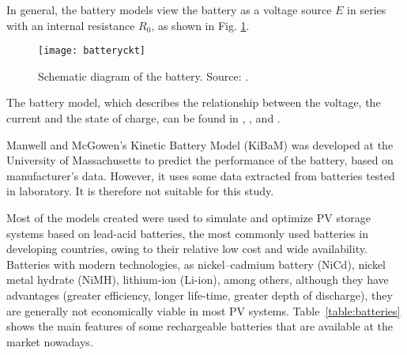 In general, the battery models view the battery as a voltage source $ E $ in series with an internal resistance $ R_{0} $, as shown in Fig. \ref{fig:batteryckt}. 

\begin{figure}[h]
\texttt{[image: batteryckt]}
\centering
\caption{Schematic diagram of the battery. Source: \cite{Hansen}.}
\label{fig:batteryckt}
\end{figure}


The battery model, which describes the relationship between the voltage, the current and the state of charge, can be found in \cite{Copetti}, \cite{Manwell93}, and \cite{Manwell94}.  

Manwell and McGowen's Kinetic Battery Model (KiBaM)  \cite{Manwell93} was developed at the University of Massachusetts to predict the performance of the battery, based on manufacturer's data. However, it uses some data extracted from batteries tested in laboratory. It is therefore not suitable for this study. 

Most of the models created were used to simulate and optimize PV storage systems based on lead-acid batteries, the most commonly used batteries in developing countries, owing to their relative low cost and wide availability. %
Batteries with modern technologies, as nickel–cadmium battery (NiCd), nickel metal hydrate (NiMH), lithium-ion (Li-ion), among others, although they have advantages (greater efficiency, longer life-time, greater depth of discharge), they are generally not economically viable in most PV systems. Table~\ref{table:batteries} shows the main features of some rechargeable batteries that are available at the market nowadays.

